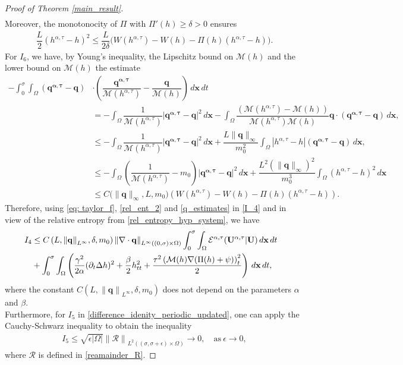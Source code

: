 \documentclass[11pt]{article}
\numberwithin{equation}{section}
\newtheorem{counter example}[theorem]{Counter Example}
\numberwithin{equation}{section}
\numberwithin{equation}{section}
\newcommand{\rel}{^{\alpha, \tau}}
\begin{document}
\begin{proof}[Proof of Theorem \ref{main_result}]
\begin{align}
\end{align}
Moreover, the monotonocity of  $\Pi$ with $\Pi'(h)\geq \delta>0$ ensures
\begin{align}\label{rel_ent_2}
\dfrac{L}{2}(h\rel-{h})^2\leq \dfrac{L}{2\delta}\big(W(h\rel)-W({h})-\Pi({h})(h\rel-{h})\big).
\end{align}
For $I_6$, we have, by Young's inequality, the Lipschitz bound on $\mathcal{M}(h)$ and the lower bound on $\mathcal{M}(h)$ the estimate
\begin{align}\label{q_estimates}
    -\int_{0}^{\sigma}\int_{\Omega}(\mathbf{q\rel-{q}})&\cdot \left(\dfrac{\mathbf{{q\rel}}}{\mathcal{M}(h\rel)}-\dfrac{\mathbf{{q}}}{\mathcal{M}({h})}\right)\, d\mathbf{x}\, dt \nonumber\\
    &=-\int_{\Omega} \dfrac{1}{\mathcal{M}(h\rel)}|\mathbf{q\rel-{q}}|^2\, d\mathbf{x}-\int_{\Omega}\dfrac{(\mathcal{M}(h\rel)-\mathcal{M}({h}))}{\mathcal{M}(h\rel)\mathcal{M}({h})}\mathbf{{q}}\cdot(\mathbf{q\rel}-\mathbf{{q}})\, d\mathbf{x}, \nonumber\\
    &\leq-\int_{\Omega} \dfrac{1}{\mathcal{M}(h\rel)}|\mathbf{q\rel-{q}}|^2\, d\mathbf{x}+\dfrac{L\lVert\mathbf{{q}}\rVert_{\infty}}{m_0^2}\int_{\Omega} |h\rel-{h}|(\mathbf{q\rel}-\mathbf{{q}})\, d\mathbf{x}, \nonumber\\
    &\leq-\int_{\Omega} \left(\dfrac{1}{\mathcal{M}(h\rel)}-m_0\right)|\mathbf{q\rel-{q}}|^2\, d\mathbf{x}+\dfrac{L^2(\lVert\mathbf{{q}}\rVert_{\infty})^2}{m_0^3}\int_{\Omega} (h\rel-{h})^2\, d\mathbf{x}\nonumber\\
    &\leq C\big(\lVert\mathbf{{q}}\rVert_{\infty}, L, m_0\big) \left(W(h\rel)-W({h})-\Pi({h})(h\rel-{h})\right).
\end{align}
Therefore, using \eqref{eq: taylor_f}, \eqref{rel_ent_2} and \eqref{q_estimates} in \eqref{I_4} and in view of the relative entropy from \eqref{rel_entropy_hyp_system}, we have
\begin{align*}
   \hspace{-1 cm} I_4&\leq C\left(L,{\lVert \mathbf{q}\rVert}_{L^{\infty}}, \delta, m_0\right)  {\lVert \nabla\cdot \mathbf{q}\rVert}_{L^{\infty}((0, \sigma)\times \Omega)}\int_{0}^{\sigma}\int_{\Omega}\mathcal{E}^{\alpha, \tau}(\mathbf{U\rel}|\mathbf{{U}})\, d\mathbf{x}\,dt\\
&+\int_{0}^{\sigma}\int_{\Omega}\left(\dfrac{\gamma^2}{2\alpha}(\partial_t\Delta{h})^2+\dfrac{\beta}{2} {h}_{tt}^2+ \dfrac{\tau^2 \left(\mathcal{M}({h})\nabla(\Pi({h})+{\psi})\right)_t^2}{2}\right)\,d\mathbf{x}\,dt,
\end{align*}
where the constant $C\left(L,{\lVert \mathbf{q}\rVert}_{L^{\infty}}, \delta, m_0\right)$ does not depend on the parameters $\alpha$ and $\beta$.\\
Furthermore, for $I_5$ in \eqref{difference_idenity_periodic_updated}, one can apply the Cauchy-Schwarz inequality to obtain the inequality
\begin{align*}
    I_5\leq \sqrt{\epsilon |\Omega| }{\lVert\mathcal{R}\rVert}_{{L}^{2}((\sigma, \sigma+\epsilon)\times \Omega)}\rightarrow 0, \quad \text{as}~\epsilon\rightarrow 0,
\end{align*}
where $\mathcal{R}$ is defined in \eqref{reamainder_R}.


\end{proof}
\end{document}

